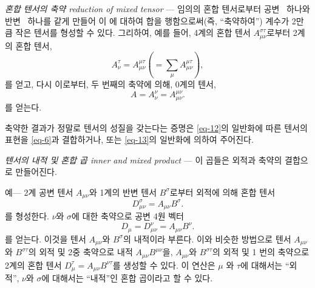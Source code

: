 \documentclass[b5paper]{article}
\begin{document}
\emph{혼합 텐서의 축약 reduction of mixed tensor} ---
임의의 혼합 텐서로부터 공변 \ind\ 하나와 반변 \ind\ 하나를 같게 만들어 이 \ind{}에 대하여 합을 행함으로써(즉, ``축약하여'') 계수가 2만큼 작은 텐서를 형성할 수 있다. 그리하여, 예를 들어, 4계의 혼합 텐서 $A_{\mu\nu}^{\sigma\tau}$로부터 2계의 혼합 텐서,
\begin{equation*}
	A_\nu^\tau = A_{\mu\nu}^{\mu\tau} \left(=\sum_\mu A_{\mu\nu}^{\mu\tau}\right),
\end{equation*}
를 얻고, 다시 이로부터, 두 번째의 축약에 의해, 0계의 텐서,
\begin{equation*}
A = A_\nu^\nu = A_{\mu\nu}^{\mu\nu}.
\end{equation*}
를 얻는다.

축약한 결과가 정말로 텐서의 성질을 갖는다는 증명은 \eqref{eq-12}의 일반화에 따른 텐서의 표현을 \eqref{eq-6}과 결합하거나, 또는 \eqref{eq-13}의 일반화에 의하여 주어진다.
  
\emph{텐서의 내적 및 혼합 곱 inner and mixed product} ---
이 곱들은 외적과 축약의 결합으로 만들어진다.

예--- 2계 공변 텐서 $A_{\mu\nu}$와 1계의 반변 텐서 $B^{\sigma}$로부터 외적에 의해 혼합 텐서 
\begin{equation*}
D_{\mu\nu}^{\sigma}=A_{\mu\nu} B^{\sigma}.
\end{equation*}
를 형성한다. \ind{} $\nu$와 $\sigma$에 대한 축약으로 공변 4원 벡터
\begin{equation*}
	D_\mu = D_{\mu\nu}^{\nu}=A_{\mu\nu} B^{\nu}.
\end{equation*}
를 얻는다. 이것을 텐서 $A_{\mu\nu}$와  $B^{\sigma}$의 내적이라 부른다. 이와 비슷한 방법으로 
텐서 $A_{\mu\nu}$와 $B^{\sigma\tau}$의 외적 및 2중 축약으로 내적 $A_{\mu\nu} B^{\mu\nu}$을, $A_{\mu\nu}$와 $B^{\sigma\tau}$의 외적 및 1 번의 축약으로 2계의 혼합 텐서 $D_\mu^\tau=A_{\mu\nu} B^{\nu\tau}$를 생성할 수 있다. 이 연산은 \ind{} $\mu$ 와 $\tau$에 대해서는 ``외적'', \ind{} $\nu$와 $\sigma$에 대해서는 ``내적''인 혼합 곱이라고 할 수 있다.
\end{document}

